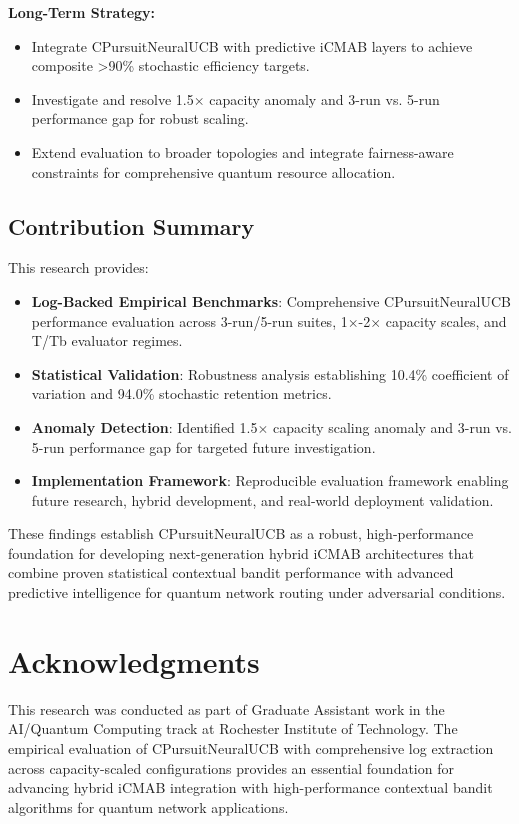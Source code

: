 \documentclass[12pt,a4paper]{article}
\newcommand{\performance}[1]{\textcolor{performancecolor}{\textbf{#1}}}
\newcommand{\critical}[1]{\textcolor{criticalcolor}{\textbf{#1}}}
\newcommand{\success}[1]{\textcolor{successcolor}{\textbf{#1}}}
\begin{document}
\textbf{Long-Term Strategy:}
\begin{itemize}
\item Integrate CPursuitNeuralUCB with predictive iCMAB layers to achieve composite >90\% stochastic efficiency targets.
\item Investigate and resolve 1.5$\times$ capacity anomaly and 3-run vs. 5-run performance gap for robust scaling.
\item Extend evaluation to broader topologies and integrate fairness-aware constraints for comprehensive quantum resource allocation.
\end{itemize}

\subsection{Contribution Summary}

This research provides:

\begin{itemize}
\item \performance{\textbf{Log-Backed Empirical Benchmarks}}: Comprehensive CPursuitNeuralUCB performance evaluation across 3-run/5-run suites, 1$\times$-2$\times$ capacity scales, and T/Tb evaluator regimes.

\item \success{\textbf{Statistical Validation}}: Robustness analysis establishing 10.4\% coefficient of variation and 94.0\% stochastic retention metrics.

\item \critical{\textbf{Anomaly Detection}}: Identified 1.5$\times$ capacity scaling anomaly and 3-run vs. 5-run performance gap for targeted future investigation.

\item \textbf{Implementation Framework}: Reproducible evaluation framework enabling future research, hybrid development, and real-world deployment validation.
\end{itemize}

These findings establish CPursuitNeuralUCB as a robust, high-performance foundation for developing next-generation hybrid iCMAB architectures that combine proven statistical contextual bandit performance with advanced predictive intelligence for quantum network routing under adversarial conditions.

\section{Acknowledgments}

This research was conducted as part of Graduate Assistant work in the AI/Quantum Computing track at Rochester Institute of Technology. The empirical evaluation of CPursuitNeuralUCB with comprehensive log extraction across capacity-scaled configurations provides an essential foundation for advancing hybrid iCMAB integration with high-performance contextual bandit algorithms for quantum network applications.
\end{document}
